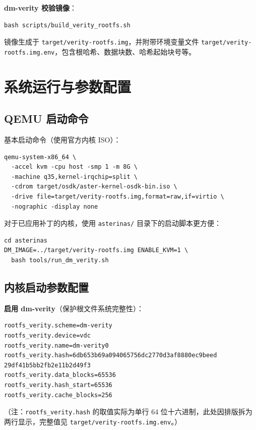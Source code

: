 \textbf{dm-verity 校验镜像}：
\begin{lstlisting}[basicstyle=\ttfamily\small, breaklines=true]
bash scripts/build_verity_rootfs.sh
\end{lstlisting}

镜像生成于 \texttt{target/\allowbreak verity-\allowbreak rootfs.img}，并附带环境变量文件 \texttt{target/\allowbreak verity-\allowbreak rootfs.img.env}，包含根哈希、数据块数、哈希起始块号等。

\section{系统运行与参数配置}

\subsection{QEMU 启动命令}

基本启动命令（使用官方内核 ISO）：
\begin{lstlisting}[basicstyle=\ttfamily\small, breaklines=true]
qemu-system-x86_64 \
  -accel kvm -cpu host -smp 1 -m 8G \
  -machine q35,kernel-irqchip=split \
  -cdrom target/osdk/aster-kernel-osdk-bin.iso \
  -drive file=target/verity-rootfs.img,format=raw,if=virtio \
  -nographic -display none
\end{lstlisting}

对于已应用补丁的内核，使用 \texttt{asterinas/} 目录下的启动脚本更方便：
\begin{lstlisting}[basicstyle=\ttfamily\small, breaklines=true]
cd asterinas
DM_IMAGE=../target/verity-rootfs.img ENABLE_KVM=1 \
  bash tools/run_dm_verity.sh
\end{lstlisting}

\subsection{内核启动参数配置}

\textbf{启用 dm-verity}（保护根文件系统完整性）：
\begin{lstlisting}[basicstyle=\ttfamily\small, breaklines=true]
rootfs_verity.scheme=dm-verity
rootfs_verity.device=vdc
rootfs_verity.name=dm-verity0
rootfs_verity.hash=6db653b69a094065756dc2770d3af8880ec9beed
29df41b5bb2fb2e11b2d49f3
rootfs_verity.data_blocks=65536
rootfs_verity.hash_start=65536
rootfs_verity.cache_blocks=256
\end{lstlisting}
（注：\texttt{rootfs\_verity.hash} 的取值实际为单行 64 位十六进制，此处因排版拆为两行显示，完整值见 \texttt{target/\allowbreak verity-\allowbreak rootfs.img.env}。）

